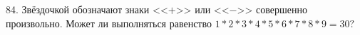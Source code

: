 84. Звёздочкой обозначают знаки <<$+$>> или <<$-$>> совершенно произвольно. Может ли выполняться равенство $1*2*3*4*5*6*7*8*9=30?$\\
